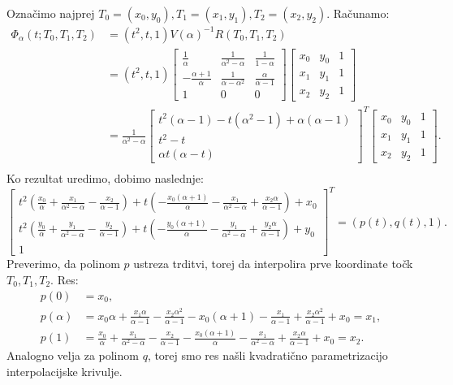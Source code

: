 \documentclass[mat1]{fmfdelo}
\newcommand{\al}{\alpha}
\begin{document}
\begin{dokaz}
Označimo najprej $T_0 = (x_0, y_0), T_1 = (x_1, y_1), T_2 = (x_2, y_2)$. Računamo:
\begin{align*}
\Phi_\al(t; T_0, T_1, T_2) &=  (t^2, t, 1) V(\al)^{-1} R(T_0, T_1, T_2) \\
				&=  (t^2, t, 1)  
\begin{bmatrix}
\frac{1}{\al} & \frac{1}{\al^2 - \al} & \frac{1}{1-\al} \\
- \frac{\al + 1}{\al} & \frac{1}{\al - \al^2} & \frac{\al}{\al-1} \\
1 & 0 & 0
\end{bmatrix}
\begin{bmatrix}
x_0 & y_0 & 1 \\
x_1 & y_1 & 1 \\
x_2 & y_2 & 1 
\end{bmatrix}
\\
				&= \frac{1}{\al^2 - \al} 
\begin{bmatrix}
t^2(\al - 1) - t(\al^2 - 1) + \al(\al - 1) \\
 t^2 - t \\
\al t(\al - t)
\end{bmatrix}
^T
\begin{bmatrix}
x_0 & y_0 & 1 \\
x_1 & y_1 & 1 \\
x_2 & y_2 & 1 
\end{bmatrix}
.\\
\end{align*}
Ko rezultat uredimo, dobimo naslednje: 
$$ 
\begin{bmatrix}
t^2 ( \frac{x_0}{\al} + \frac{x_1}{\al^2 - \al} - \frac{x_2}{\al -1} ) + t(- \frac{x_0(\al + 1)}{\al} - \frac{x_1}{\al^2 - \al} + \frac{x_2 \al}{\al - 1}) + x_0 \\
t^2 ( \frac{y_0}{\al} + \frac{y_1}{\al^2 - \al} - \frac{y_2}{\al -1} ) + t(- \frac{y_0(\al + 1)}{\al} - \frac{y_1}{\al^2 - \al} + \frac{y_2 \al}{\al - 1}) + y_0 \\
1
\end{bmatrix}
^T
= (p(t), q(t), 1).
$$
Preverimo, da polinom $p$ ustreza trditvi, torej da interpolira prve koordinate točk $T_0, T_1, T_2$. Res:
\begin{align*}
p(0) &= x_0, \\
p(\al) &= x_0 \al  + \frac{x_1 \al }{\al - 1} - \frac{x_2 \al^2 }{\al - 1} - x_0(\al + 1) - \frac{x_1}{\al - 1} + \frac{ x_2 \al^2}{\al - 1} + x_0 = x_1, \\
p(1) &= \frac{x_0}{\al} + \frac{x_1}{\al^2 - \al} - \frac{x_2}{\al -1} - \frac{x_0(\al + 1)}{\al} - \frac{x_1}{\al^2 - \al} + \frac{x_2 \al}{\al - 1} + x_0 = x_2.
\end{align*}
Analogno velja za polinom $q$, torej smo res našli kvadratično parametrizacijo interpolacijske krivulje.
\end{dokaz}
\end{document}
